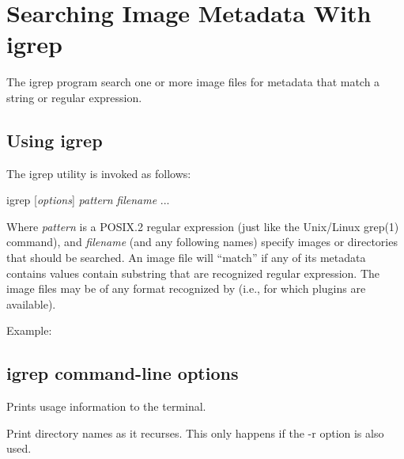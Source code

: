 \chapter{Searching Image Metadata With {\kw igrep}}
\label{chap:igrep}


The {\cf igrep} program search one or more image files for metadata
that match a string or regular expression.



\section{Using {\cf igrep}}

The {\cf igrep} utility is invoked as follows:

\bigskip

\hspace{0.25in} {\cf igrep} [\emph{options}] \emph{pattern} \emph{filename} ...

\medskip

Where \emph{pattern} is a POSIX.2 regular expression (just like the
Unix/Linux {\cf grep(1)} command), and \emph{filename} (and any
following names) specify images or directories that should be searched.
An image file will ``match'' if any of its metadata contains values
contain substring that are recognized regular expression.  The image
files may be of any format recognized by \product (i.e., for which
\ImageInput plugins are available).

Example:





\section{{\cf igrep} command-line options}

Prints usage information to the terminal.
\apiend

Print directory names as it recurses.  This only happens if the {\cf -r}
option is also used.
\apiend

